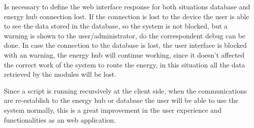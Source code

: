 Is necessary to define the web interface response for both situations database and energy hub connection lost. If the connection is lost to the device the user is able to see the data stored in the database, so the system is not blocked, but a warning is shown to the user/administrator, do the correspondent debug can be done. In case the connection to the database is lost, the user interface is blocked with an warning, the energy hub will continue working, since it doesn't affected the correct work of the system to route the energy, in this situation all the data retrieved by the modules will be lost.

Since a script is running recursively at the client side, when the communications are re-establish to the energy hub or database the user will be able to use the system normally, this is a great improvement in the user experience and functionalities as an web application.
